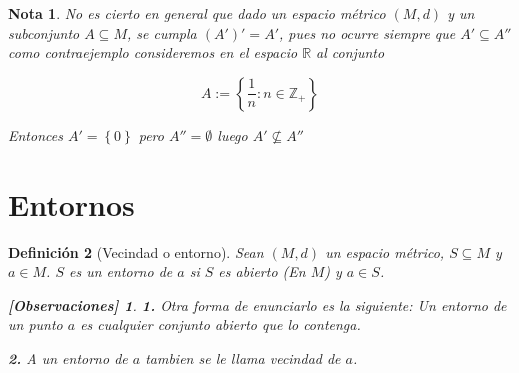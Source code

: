 \documentclass[oneside]{book} %
\theoremstyle{Teorema}
\newtheorem{Definicion}{Definición}[chapter]
\newtheorem{Nota}[Definicion]{Nota}
\theoremstyle{Ejemplos}
\theoremstyle{[Obs]}
\newtheorem*{Obs}{[Observaciones]}
\renewcommand{\{}{\left\lbrace} %
\renewcommand{\}}{\right\rbrace} %
\renewcommand{\sc}{\subseteq} %
\newcommand{\R}{\mathbb{R}} %
\newcommand{\Z}{\mathbb{Z}} %
\begin{document}
			\begin{Nota}\setlength{\parindent}{0em}
			
				No es cierto en general que dado un espacio métrico $(M, d)$ y un subconjunto $A \sc M$, se cumpla $(A')' = A'$, pues no ocurre siempre que $A' \sc A''$ como contraejemplo consideremos en el espacio $\R$ al conjunto

				\[ A:= \{ \frac{1}{n} : n \in \Z_{+} \} \]
			
				Entonces $A' = \{ 0 \}$ pero $A'' = \emptyset$ luego $A' \nsubseteq A''$

			\end{Nota}

		\section{Entornos}

			\begin{Definicion}[Vecindad o entorno]\setlength{\parindent}{0em}
						
				Sean $(M, d)$ un espacio métrico, $S \sc M$ y $a \in M$. $S$ es un entorno de $a$ si $S$ es abierto (En $M$) y $a \in S$. 

				\begin{Obs}
				
					\textbf{1.} Otra forma de enunciarlo es la siguiente: Un entorno de un punto $a$ es cualquier conjunto abierto que lo contenga. 

					\textbf{2.} A un entorno de $a$ tambien se le llama vecindad de $a$. 
				
				\end{Obs}

			\end{Definicion}
\end{document}

